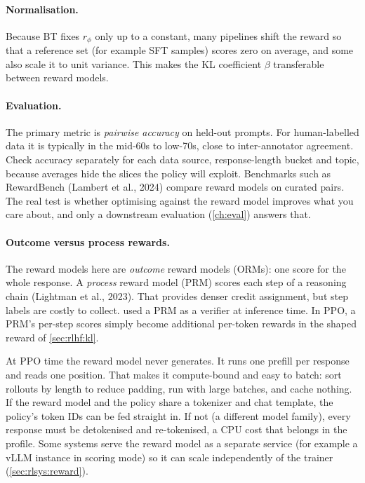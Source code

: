 \paragraph{Normalisation.} Because BT fixes $r_\phi$ only up to a constant, many pipelines shift
the reward so that a reference set (for example SFT samples) scores zero on average, and some also
scale it to unit variance. This makes the KL coefficient $\beta$ transferable between reward models.

\paragraph{Evaluation.} The primary metric is \emph{pairwise accuracy} on held-out prompts. For
human-labelled data it is typically in the mid-60s to low-70s, close to inter-annotator agreement.
Check accuracy separately for each data source, response-length bucket and topic, because averages hide the
slices the policy will exploit. Benchmarks such as RewardBench (Lambert et al., 2024) compare reward models
on curated pairs. The real test is whether optimising against the reward model improves what you
care about, and only a downstream evaluation (\cref{ch:eval}) answers that.

\paragraph{Outcome versus process rewards.} The reward models here are \emph{outcome} reward models
(ORMs): one score for the whole response. A \emph{process} reward model (PRM) scores each step of a
reasoning chain (Lightman et al., 2023). That provides denser credit assignment, but step labels are costly
to collect.  used a PRM as a verifier at inference time. In PPO, a PRM's
per-step scores simply become additional per-token rewards in the shaped reward of
\cref{sec:rlhf:kl}.

\begin{systemslens}
At PPO time the reward model never generates. It runs one prefill per response and reads one
position. That makes it compute-bound and easy to batch: sort rollouts by length to reduce
padding, run with large batches, and cache nothing. If the reward model and the policy share a
tokenizer and chat template, the policy's token IDs can be fed straight in. If not (a
different model family), every response must be detokenised and re-tokenised, a CPU cost that
belongs in the profile. Some systems serve the reward model as a separate service (for example a vLLM
instance in scoring mode) so it can scale independently of the trainer (\cref{sec:rlsys:reward}).
\end{systemslens}

